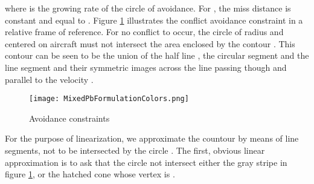 \documentclass[a4paper, 10pt]{IEEEtran}
\begin{document}
where  is the growing rate of the circle of avoidance. For , the miss distance is constant and equal to . Figure  \ref{fig:algoConstraints} illustrates the conflict avoidance constraint in a relative frame of reference. For no conflict to occur, the circle  of radius  and centered on aircraft  must not intersect the area enclosed by the contour . This contour  can be seen to be the union of the half line , the circular segment  and the line segment  and their symmetric images across the line passing though  and parallel to the velocity . 

 \begin{figure}[ht]
\centering
 \texttt{[image: MixedPbFormulationColors.png]}
\caption{Avoidance constraints}\label{fig:algoConstraints}
\end{figure}


For the purpose of linearization, we approximate the countour  by means of line segments, not to be intersected by the circle .  The first, obvious linear approximation is to ask that the circle  not intersect either the gray stripe in figure \ref{fig:algoConstraints}, or the hatched cone whose vertex is . 
\end{document}
